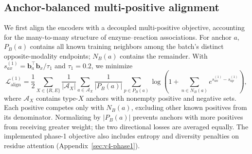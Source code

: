 \subsection{Anchor-balanced multi-positive alignment}
\label{sec:alignment-objective}
\label{sec:paper-v4-phase1}
We first align the encoders with a decoupled multi-positive objective,
accounting for the many-to-many structure of enzyme--reaction associations.
For anchor $a$, $P_B(a)$ contains all known training neighbors among the
batch's distinct opposite-modality endpoints; $N_B(a)$ contains the remainder.
With $s_{ax}^{(1)}=\mathbf{b}_a^\top\mathbf{b}_x/\tau_1$ and $\tau_1=0.2$,
we minimize
\begin{equation}
 \mathcal L_{\mathrm{align}}^{(1)}=
 \frac12\sum_{X\in\{R,E\}}\frac{1}{|\mathcal A_X|}\sum_{a\in\mathcal A_X}
 \frac{1}{|P_B(a)|}\sum_{p\in P_B(a)}
 \log\!\left(1+\sum_{n\in N_B(a)}e^{s_{an}^{(1)}-s_{ap}^{(1)}}\right),
 \label{eq:paper-phase1}
\end{equation}
where $\mathcal A_X$ contains type-$X$ anchors with nonempty positive and
negative sets. Each positive competes only with $N_B(a)$, excluding other
known positives from its denominator. Normalizing by $|P_B(a)|$ prevents
anchors with more positives from receiving greater weight; the two
directional losses are averaged equally. The implemented phase-1 objective
also includes entropy and diversity penalties on residue attention
(Appendix~\ref{sec:v4-phase1}).

